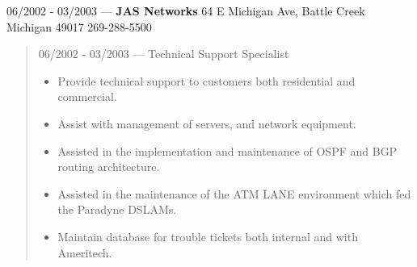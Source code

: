 06/2002 - 03/2003 --- {\bf JAS Networks} 64 E Michigan Ave, Battle Creek Michigan 49017 269-288-5500
\begin{quote}
06/2002 - 03/2003 --- Technical Support Specialist\\
\begin{itemize}
\item Provide technical support to customers both residential and commercial.
\item Assist with management of servers, and network equipment.
\item Assisted in the implementation and maintenance of OSPF and BGP routing
architecture.
\item Assisted in the maintenance of the ATM LANE environment which fed the
Paradyne DSLAMs.
\item Maintain database for trouble tickets both internal and with Ameritech.
\end{itemize}
\end{quote}
